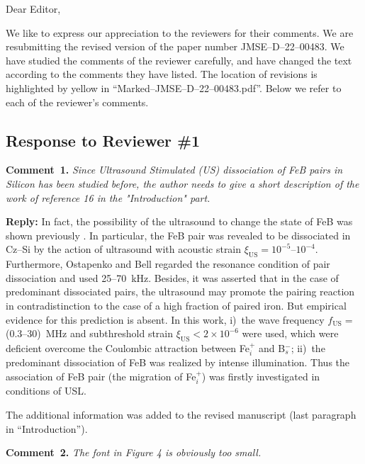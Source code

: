 \documentclass[sn-mathphys]{sn-jnl}
\begin{document}
Dear Editor,

We like to express our appreciation to the reviewers for their comments.
We are resubmitting the revised version of the paper number JMSE--D--22--00483.
We have studied the comments of the reviewer carefully, and have changed the text according to the comments they
have listed.
The location of revisions is  highlighted by yellow in ``Marked--JMSE--D--22--00483.pdf''.
Below we refer to each of the reviewer’s comments.



\subsection*{Response to Reviewer \#1 }

\noindent
\textcolor[rgb]{0.00,0.50,1.00}{\textbf{Comment~1.}}
\emph{Since Ultrasound Stimulated (US) dissociation of FeB pairs in Silicon has been studied before, the author needs to give a short description of the work of reference 16 in the "Introduction" part.}

\noindent
\textcolor[rgb]{0.51,0.00,0.00}{\textbf{Reply:}}
In fact, the possibility of the ultrasound to  change the state of FeB was shown previously  \cite{Ostapenko1994APL,Ostapenko1995}.
In particular, the
FeB pair was revealed \cite{Ostapenko1995} to be dissociated in Cz–Si by the action of ultrasound with acoustic strain $\xi_\mathrm{US}=10^{-5}$--$10^{-4}$.
Furthermore, Ostapenko and Bell \cite{Ostapenko1995} regarded the resonance condition of pair dissociation and used 25--70~kHz.
Besides, it was asserted \cite{Ostapenko1994APL} that in the case of
predominant dissociated pairs, the ultrasound may promote the pairing reaction in contradistinction to the case of a
high fraction of paired iron.
But  empirical evidence  for this prediction  is absent.
In this work,
i)~the wave frequency $f_\mathrm{US}=$(0.3--30)~MHz and subthreshold strain $\xi_\mathrm{US}<2\times10^{-6}$ were used, which were deficient overcome the Coulombic attraction between Fe$_i^+$ and B$_s^-$;
ii)~the predominant  dissociation of FeB was realized by intense illumination.
Thus the association of FeB pair (the migration  of Fe$_i^+$) was firstly investigated in conditions of USL.


The additional information was added to the revised manuscript
(last paragraph in ``Introduction'').



\vspace{1cm}
\noindent
\textcolor[rgb]{0.00,0.50,1.00}{\textbf{Comment~2.}}
\emph{The font in Figure 4 is obviously too small.}
\end{document}
